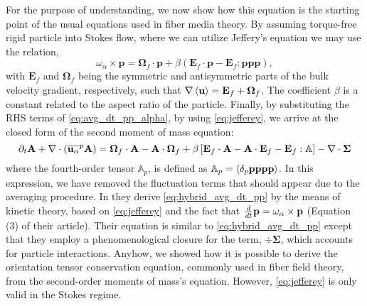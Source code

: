 For the purpose of understanding, we now show how this equation is the starting point of the usual equations used in fiber media theory. 
By assuming torque-free rigid particle into Stokes flow, where we can utilize Jeffery's equation \citep{guazzelli2011} we may use the relation,
\begin{equation}
    \omega_\alpha \times \textbf{p}
    = \bm{\Omega}_f\cdot\textbf{p}
    + \beta\left(
        \textbf{E}_f\cdot \textbf{p}
        - \textbf{E}_f : \textbf{ppp}
    \right),
    \label{eq:jefferey}
\end{equation}
with $\textbf{E}_f$ and $\bm{\Omega}_f$ being the symmetric and antisymmetric parts of the bulk velocity gradient, respectively, such that $\mathbf{\nabla}\left<\textbf{u}\right>=\textbf{E}_f+\bm{\Omega}_f$.
The coefficient $\beta$  is a constant related to the aspect ratio of the particle.
Finally, by substituting the RHS terms of \ref{eq:avg_dt_pp_alpha}, by using \ref{eq:jefferey}, we arrive at the closed form of the second moment of mass equation:
\begin{equation}
    \pddt \textbf{A}
    + \div (
        \pnnavg{\textbf{u}_\alpha}\textbf{A}
    )
    =
    \bm{\Omega}_f \cdot \textbf{A}
    - \textbf{A} \cdot \bm{\Omega}_f
    + \beta\left[
        \textbf{E}_f \cdot \textbf{A}
        -\textbf{A} \cdot \textbf{E}_f
        - \textbf{E}_f : \mathbb{A}
    \right]
    - \div \mathbf{\Sigma}
    \label{eq:hybrid_avg_dt_pp}
\end{equation}
where the fourth-order tensor $\mathbb{A}_p$, is defined as $\mathbb{A}_p = \left<\delta_p \textbf{pppp}\right>$.
In this expression, we have removed the fluctuation terms that should appear due to the averaging procedure. 
In \citet{wang2008objective} they derive \ref{eq:hybrid_avg_dt_pp} by the means of kinetic theory, based on \ref{eq:jefferey} and the fact that $\frac{d}{dt} \textbf{p} = \omega_\alpha \times \textbf{p}$ (Equation (3) of their article).
Their equation is similar to \ref{eq:hybrid_avg_dt_pp} except that they employ a phenomenological closure for the term, $\div \mathbf{\Sigma}$, which accounts for particle interactions.
Anyhow, we showed how it is possible to derive the orientation tensor conservation equation, commonly used in fiber field theory, from the second-order moments of mass's equation. 
However, \ref{eq:jefferey} is only valid in the Stokes regime. 


